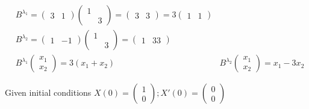 \documentclass[twoside,10pt]{amsart}
\begin{document}
\[
\begin{aligned}
  &  B^{\lambda_1} = \left( \begin{matrix} 3 & 1 \end{matrix} \right) \left( \begin{matrix} 1 & \\ & 3 \end{matrix} \right) = \left( \begin{matrix} 3 & 3 \end{matrix} \right) = 3 \left( \begin{matrix} 1 & 1 \end{matrix} \right) \\
  & B^{\lambda_2} = \left( \begin{matrix} 1 & -1 \end{matrix} \right) \left( \begin{matrix} 1 & \\ & 3 \end{matrix} \right) = \left( \begin{matrix} 1 & 33 \end{matrix} \right)  \\
  & B^{\lambda_1} \left( \begin{matrix} x_1 \\ x_2 \end{matrix} \right) = 3 (x_1 + x_2 )
  & B^{\lambda_2}  \left( \begin{matrix} x_1 \\ x_2 \end{matrix} \right) = x_1 -3x_2 
\end{aligned}
\]

Given initial conditions $X(0) = \left( \begin{matrix} 1 \\  0 \end{matrix} \right); X'(0) = \left( \begin{matrix} 0 \\ 0 \end{matrix} \right)$
\end{document}
